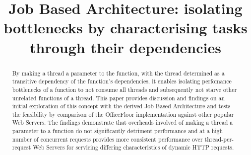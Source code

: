 \documentclass[conference]{ieee/IEEEtran}
\begin{document}
\title{Job Based Architecture: isolating bottlenecks by characterising tasks
through their dependencies}


\author{
}


% 








\maketitle


\begin{abstract}
By making a thread a parameter to the function, with the thread determined as a
transitive dependency of the function's dependencies, it enables isolating
perfomance bottlenecks of a function to not consume all threads and
subsequently not starve other unrelated functions of a thread.  This paper
provides discussion and findings on an initial exploration of this concept with the
derived Job Based Architecture and tests the feasibility by comparison of the
OfficeFloor implementation against other popular Web Servers.  The findings
demonstrate that overheads involved of making a thread a parameter to a
function do not significantly detriment performance and at a high number of
concurrent requests provides more consistent performance over
thread-per-request Web Servers for servicing differing characteristics of
dynamic HTTP requests.
\end{abstract}
\end{document}
